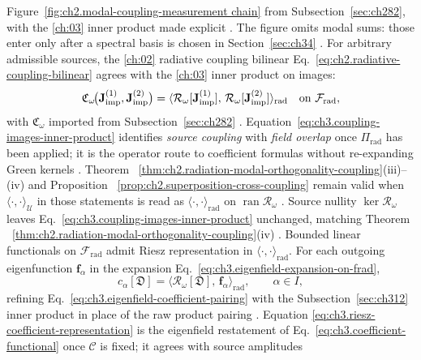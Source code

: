 Figure~\ref{fig:ch2.modal-coupling-measurement chain} from Subsection~\ref{sec:ch282}, with the \ref{ch:03}
inner product made explicit \cite{stratton1941}. The figure omits modal sums: those enter only
after a spectral basis is chosen in Section~\ref{sec:ch34} \cite{hansen1988}.
For arbitrary admissible sources, the \ref{ch:02} radiative coupling bilinear
Eq.~\eqref{eq:ch2.radiative-coupling-bilinear} agrees with the \ref{ch:03} inner product on images:
\begin{equation}
\label{eq:ch3.coupling-images-inner-product}
\mathfrak{C}_\omega\!\big(\mathbf{J}_{\mathrm{imp}}^{(1)},\mathbf{J}_{\mathrm{imp}}^{(2)}\big)
=
\langle \mathcal{R}_\omega[\mathbf{J}_{\mathrm{imp}}^{(1)}],\,\mathcal{R}_\omega[\mathbf{J}_{\mathrm{imp}}^{(2)}]\rangle_{\mathrm{rad}}
\quad\text{on}\ \mathcal{F}_{\mathrm{rad}},
\end{equation}
with \(\mathfrak{C}_\omega\) imported from Subsection~\ref{sec:ch282} \cite{stratton1941}.
Equation~\eqref{eq:ch3.coupling-images-inner-product} identifies \emph{source coupling} with \emph{field
overlap} once \(\Pi_{\mathrm{rad}}\) has been applied; it is the operator route to coefficient formulas
without re-expanding Green kernels \cite{stratton1941}. Theorem
~\ref{thm:ch2.radiation-modal-orthogonality-coupling}(iii)--(iv) and Proposition
~\ref{prop:ch2.superposition-cross-coupling} remain valid when
\(\langle\cdot,\cdot\rangle_{\mathcal{U}}\) in those statements is read as
\(\langle\cdot,\cdot\rangle_{\mathrm{rad}}\) on \(\operatorname{ran}\mathcal{R}_\omega\)
\cite{stratton1941}. Source nullity \(\ker\mathcal{R}_\omega\) leaves
Eq.~\eqref{eq:ch3.coupling-images-inner-product} unchanged, matching Theorem
~\ref{thm:ch2.radiation-modal-orthogonality-coupling}(iv) \cite{harrington2001}.
Bounded linear functionals on \(\mathcal{F}_{\mathrm{rad}}\) admit Riesz representation in
\(\langle\cdot,\cdot\rangle_{\mathrm{rad}}\). For each outgoing eigenfunction \(\mathbf{f}_\alpha\) in the
expansion Eq.~\eqref{eq:ch3.eigenfield-expansion-on-frad},
\begin{equation}
\label{eq:ch3.riesz-coefficient-representation}
c_\alpha[\mathfrak{D}]
=
\big\langle \mathcal{R}_\omega[\mathfrak{D}],\,\mathbf{f}_\alpha\big\rangle_{\mathrm{rad}},
\qquad
\alpha\in I,
\end{equation}
refining Eq.~\eqref{eq:ch3.eigenfield-coefficient-pairing} with the Subsection~\ref{sec:ch312} inner product
in place of the raw product pairing \cite{stratton1941}. Equation
\eqref{eq:ch3.riesz-coefficient-representation} is the eigenfield restatement of
Eq.~\eqref{eq:ch3.coefficient-functional} once \(\mathcal{C}\) is fixed; it agrees with source amplitudes
